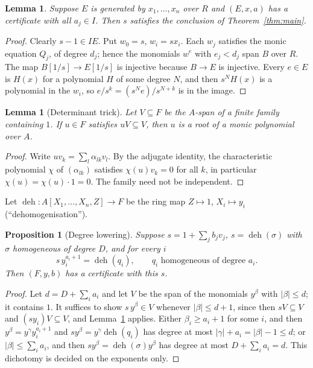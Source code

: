 \documentclass[11pt]{amsart}
\numberwithin{equation}{section}
\newtheorem{proposition}[theorem]{Proposition}
\newtheorem{lemma}[theorem]{Lemma}
\theoremstyle{definition}
\theoremstyle{remark}
\DeclareMathOperator{\deh}{deh}
\begin{document}
\begin{lemma}\label{lem:cert-conclusion}
Suppose $E$ is generated by $x_1,\ldots,x_n$ over $R$ and $(E,x,a)$
has a certificate with all $a_j\in I$. Then $s$ satisfies the
conclusion of Theorem~\ref{thm:main}.
\end{lemma}
\begin{proof}
Clearly $s-1\in IE$. Put $w_0=s$, $w_i=sx_i$. Each $w_j$ satisfies
the monic equation $Q_j$, of degree $d_j$; hence the monomials
$w^e$ with $e_j<d_j$ span $B$ over $R$. The map
$B[1/s]\to E[1/s]$ is injective because $B\to E$ is injective. Every
$e\in E$ is $H(x)$ for a polynomial $H$ of some degree $N$, and then
$s^NH(x)$ is a polynomial in the $w_i$, so $e/s^k=(s^Ne)/s^{N+k}$ is
in the image.
\end{proof}

\begin{lemma}[Determinant trick]\label{lem:trick}
Let $V\subseteq F$ be the $A$-span of a finite family containing $1$.
If $u\in F$ satisfies $uV\subseteq V$, then $u$ is a root of a monic
polynomial over $A$.
\end{lemma}
\begin{proof}
Write $uv_k=\sum_l\alpha_{lk}v_l$. By the adjugate identity, the
characteristic polynomial $\chi$ of $(\alpha_{lk})$ satisfies
$\chi(u)v_k=0$ for all $k$, in particular $\chi(u)=\chi(u)\cdot1=0$.
The family need not be independent.
\end{proof}

Let $\deh:A[X_1,\ldots,X_n,Z]\to F$ be the ring map $Z\mapsto1$,
$X_i\mapsto y_i$ (``dehomogenisation'').

\begin{proposition}[Degree lowering]\label{prop:dl}
Suppose $s=1+\sum_jb_jv_j$, $s=\deh(\sigma)$ with $\sigma$ homogeneous
of degree $D$, and for every $i$
\begin{equation}\tag{DL}
 s\,y_i^{a_i+1}=\deh(q_i),\qquad q_i \text{ homogeneous of degree } a_i .
\end{equation}
Then $(F,y,b)$ has a certificate with this $s$.
\end{proposition}
\begin{proof}
Let $d=D+\sum_ia_i$ and let $V$ be the span of the monomials $y^\beta$
with $|\beta|\le d$; it contains $1$. It suffices to show
$s\,y^\beta\in V$ whenever $|\beta|\le d+1$, since then $sV\subseteq V$
and $(sy_i)V\subseteq V$, and Lemma~\ref{lem:trick} applies. Either
$\beta_i\ge a_i+1$ for some $i$, and then $y^\beta=y^\gamma y_i^{a_i+1}$
and $sy^\beta=y^\gamma\deh(q_i)$ has degree at most
$|\gamma|+a_i=|\beta|-1\le d$; or $|\beta|\le\sum_ia_i$, and then
$sy^\beta=\deh(\sigma)y^\beta$ has degree at most $D+\sum_ia_i=d$.
This dichotomy is decided on the exponents only.
\end{proof}
\end{document}
